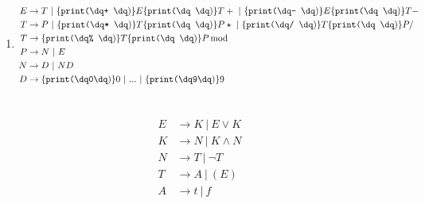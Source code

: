 \documentclass[a4paper,10pt]{scrartcl}
\begin{document}
\begin{enumerate}
\begin{center}
{{                    
                }
                \Tr{$-$}
            }
        \end{center}
 \item  \begin{align*}
         E &\to T\ |\ \print{+ } E \print{ } T +\ |\  \print{- } E \print{ } T -\\
         T &\to P\ |\ \print{* }T \print{ } P \star\ |\ \print{/ }T \print{ } P /\\
         T &\to \print{\% }T \print{ } P \operatorname{mod}\\
         P &\to N\ |\ E \\
         N &\to D\ |\ ND \\
         D &\to \print{0}0\ |\ ...\ |\ \print{9}9 \\
        \end{align*}
\end{enumerate}

\section{}
\begin{align*}
    E &\to K\ |\ E \lor K \\
    K &\to N\ |\ K \land N \\
    N &\to T\ |\ \neg T\\
    T &\to A\ |\ (E)\\
    A &\to t\ |\ f
\end{align*}
\end{document}
